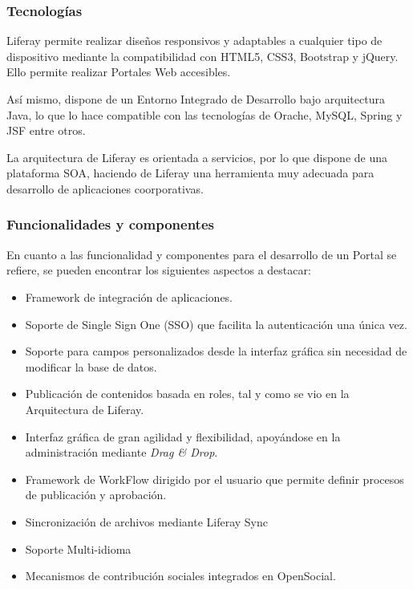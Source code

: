 \subsubsection{Tecnologías}
\par Liferay permite realizar diseños responsivos y adaptables a cualquier tipo de dispositivo mediante la compatibilidad con HTML5, CSS3, Bootstrap y jQuery. Ello permite realizar Portales Web accesibles.
\par Así mismo, dispone de un Entorno Integrado de Desarrollo bajo arquitectura Java, lo que lo hace compatible con las tecnologías de Orache, MySQL, Spring y JSF entre otros.
\par La arquitectura de Liferay es orientada a servicios, por lo que dispone de una plataforma SOA, haciendo de Liferay una herramienta muy adecuada para desarrollo de aplicaciones coorporativas.
\subsubsection{Funcionalidades y componentes}
\par En cuanto a las funcionalidad y componentes para el desarrollo de un Portal se refiere, se pueden encontrar los siguientes aspectos a destacar:
\begin{itemize}
    \item Framework de integración de aplicaciones.
    \item Soporte de Single Sign One (SSO) que facilita la autenticación una única vez.
    \item Soporte para campos personalizados desde la interfaz gráfica sin necesidad de modificar la base de datos.
    \item Publicación de contenidos basada en roles, tal y como se vio en la Arquitectura de Liferay.
    \item Interfaz gráfica de gran agilidad y flexibilidad, apoyándose en la administración mediante \textit{Drag & Drop}.
    \item Framework de WorkFlow dirigido por el usuario que permite definir procesos de publicación y aprobación.
    \item Sincronización de archivos mediante Liferay Sync
    \item Soporte Multi-idioma
    \item Mecanismos de contribución sociales integrados en OpenSocial.
\end{itemize}

